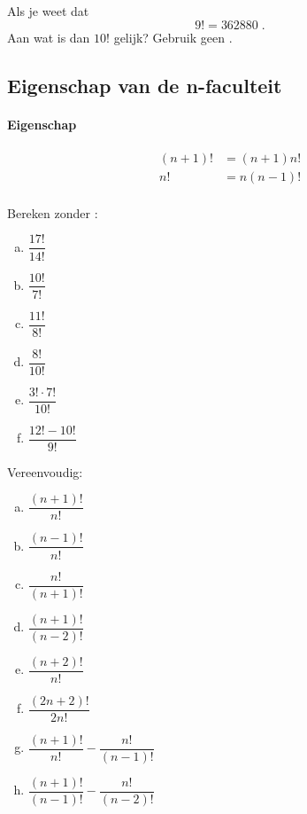 \documentclass[12pt,twoside]{article}
\begin{document}
\begin{oefening}
Als je weet dat
$$9!=362880\;.$$
Aan wat is dan $10!$ gelijk? Gebruik geen .
\end{oefening}

\subsection{Eigenschap van de n-faculteit}

\paragraph*{Eigenschap}
\begin{mdframed}
\begin{align*}
  (n+1)!&=(n+1)n!\\
  n!&=n(n-1)!\\
\end{align*}
\end{mdframed}

\begin{oefening}
Bereken zonder :
\begin{multicols}{3}
\begin{enumerate}[(a)]
  \itemsep0.7em
  \item $\dfrac{17!}{14!}$
  \item $\dfrac{10!}{7!}$
  \item $\dfrac{11!}{8!}$
  \item $\dfrac{8!}{10!}$
  \item $\dfrac{3!\cdot 7!}{10!}$
  \item $\dfrac{12!-10!}{9!}$
\end{enumerate}
\end{multicols}
\end{oefening}

\begin{oefening}
Vereenvoudig:
\begin{multicols}{2}
\begin{enumerate}[(a)]
  \itemsep0.7em
  \item $\dfrac{(n+1)!}{n!}$
  \item $\dfrac{(n-1)!}{n!}$
  \item $\dfrac{n!}{(n+1)!}$
  \item $\dfrac{(n+1)!}{(n-2)!}$
  \item $\dfrac{(n+2)!}{n!}$
  \item $\dfrac{(2n+2)!}{2n!}$
  \item $\dfrac{(n+1)!}{n!}-\dfrac{n!}{(n-1)!}$
  \item $\dfrac{(n+1)!}{(n-1)!}-\dfrac{n!}{(n-2)!}$
\end{enumerate}
\end{multicols}
\end{oefening}
\end{document}
